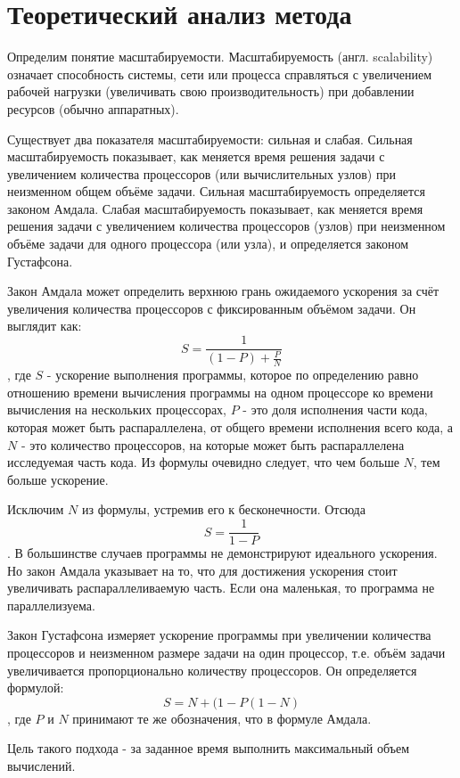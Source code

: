 \documentclass[a4paper,14pt,russian]{extreport}
\begin{document}
\section{Теоретический анализ метода}

Определим понятие масштабируемости. Масштабируемость (англ. scalability) означает способность системы, сети или процесса справляться с увеличением рабочей нагрузки (увеличивать свою производительность) при добавлении ресурсов (обычно аппаратных). 
\par Существует два показателя масштабируемости: сильная и слабая. Сильная масштабируемость показывает, как меняется время решения задачи с увеличением количества процессоров (или вычислительных узлов) при неизменном общем объёме задачи. Сильная масштабируемость определяется законом Амдала. Слабая масштабируемость показывает, как меняется время решения задачи с увеличением количества процессоров (узлов) при неизменном объёме задачи для одного процессора (или узла), и определяется законом Густафсона.
\par Закон Амдала может определить верхнюю грань ожидаемого ускорения за счёт увеличения количества процессоров с фиксированным объёмом задачи. Он выглядит как:
  $$S=\frac{1}{\left(1-P\right)+\frac{P}{N}}$$, где $S$ - ускорение выполнения программы, которое по определению равно отношению времени вычисления программы на одном процессоре ко времени вычисления на нескольких процессорах, $P$ - это доля исполнения части кода, которая может быть распараллелена, от общего времени исполнения всего кода, а $N$ - это количество процессоров, на которые может быть распараллелена исследуемая часть кода. Из формулы очевидно следует, что чем больше $N$, тем больше ускорение.
\par Исключим $N$ из формулы, устремив его к бесконечности. Отсюда $$S = \frac{1}{1-P}$$. В большинстве случаев программы не демонстрируют идеального ускорения. Но закон Амдала указывает на то, что для достижения ускорения стоит увеличивать распараллеливаемую часть. Если она маленькая, то программа не параллелизуема.
\par Закон Густафсона измеряет ускорение программы при увеличении количества процессоров и неизменном размере задачи на один процессор, т.е. объём задачи увеличивается пропорционально количеству процессоров. Он определяется формулой: $$S=N+(1-P(1-N)$$, где $P$ и $N$ принимают те же обозначения, что в формуле Амдала. 
\par Цель такого подхода - за заданное время выполнить максимальный объем вычислений.
\end{document}
